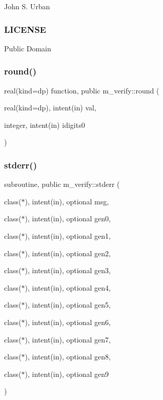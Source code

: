 John S. Urban \subsubsection*{L\+I\+C\+E\+N\+SE}

Public Domain \mbox{\label{namespacem__verify_af997c802e1ad966d55f023822b2f645a}} 
\subsubsection{\texorpdfstring{round()}{round()}}
{\footnotesize\ttfamily real(kind=dp) function, public m\+\_\+verify\+::round (\begin{DoxyParamCaption}\item[{real(kind=dp), intent(in)}]{val,  }\item[{integer, intent(in)}]{idigits0 }\end{DoxyParamCaption})}

\mbox{\label{namespacem__verify_a41f795f932767c97b5ef481a694f4f84}} 
\subsubsection{\texorpdfstring{stderr()}{stderr()}}
{\footnotesize\ttfamily subroutine, public m\+\_\+verify\+::stderr (\begin{DoxyParamCaption}\item[{class($\ast$), intent(in), optional}]{msg,  }\item[{class($\ast$), intent(in), optional}]{gen0,  }\item[{class($\ast$), intent(in), optional}]{gen1,  }\item[{class($\ast$), intent(in), optional}]{gen2,  }\item[{class($\ast$), intent(in), optional}]{gen3,  }\item[{class($\ast$), intent(in), optional}]{gen4,  }\item[{class($\ast$), intent(in), optional}]{gen5,  }\item[{class($\ast$), intent(in), optional}]{gen6,  }\item[{class($\ast$), intent(in), optional}]{gen7,  }\item[{class($\ast$), intent(in), optional}]{gen8,  }\item[{class($\ast$), intent(in), optional}]{gen9 }\end{DoxyParamCaption})}



